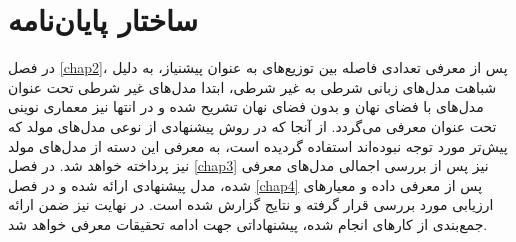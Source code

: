 \section{ساختار پایان‌نامه}
در فصل \ref{chap2}، پس از معرفی تعدادی فاصله بین توزیع‌های به عنوان پیشنیاز، به دلیل شباهت مدل‌های زبانی شرطی به غیر شرطی، ابتدا مدل‌های غیر شرطی تحت عنوان مدل‌های با فضای نهان و بدون فضای نهان تشریح شده و در انتها نیز معماری نوینی تحت عنوان \transformer{} معرفی می‌گردد. از آنجا که در روش پیشنهادی از نوعی مدل‌های مولد که پیش‌تر مورد توجه نبوده‌اند استفاده گردیده است، به معرفی این دسته از مدل‌های مولد نیز پرداخته خواهد شد. در فصل \ref{chap3} نیز پس از بررسی اجمالی مدل‌های معرفی شده، مدل پیشنهادی ارائه شده و در فصل  \ref{chap4} پس از معرفی داده و معیارهای ارزیابی مورد بررسی قرار گرفته و نتایج گزارش شده است. در نهایت نیز ضمن ارائه جمع‌بندی از کارهای انجام شده، پیشنهاداتی جهت ادامه تحقیقات معرفی خواهد شد.




